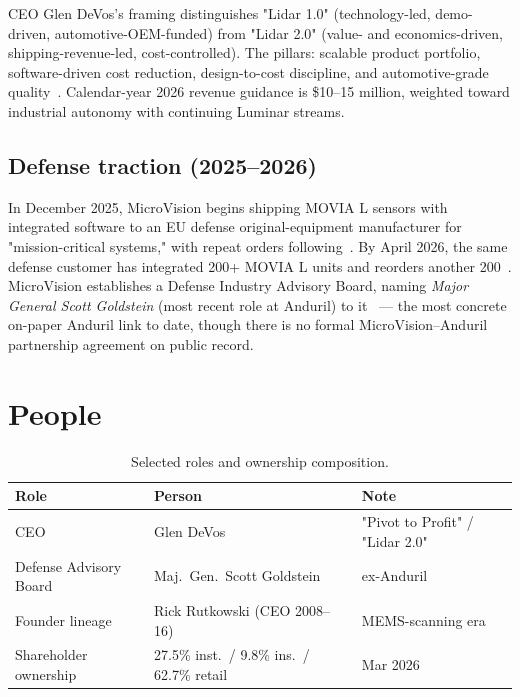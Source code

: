 \documentclass[10pt,letterpaper,twocolumn]{article}
\begin{document}
CEO Glen DeVos's framing distinguishes "Lidar 1.0" (technology-led, demo-driven, automotive-OEM-funded) from "Lidar 2.0" (value- and economics-driven, shipping-revenue-led, cost-controlled). The pillars: scalable product portfolio, software-driven cost reduction, design-to-cost discipline, and automotive-grade quality~\citep{mvis2026lidar20,seekingalpha2026guidance}. Calendar-year 2026 revenue guidance is \$10--15 million, weighted toward industrial autonomy with continuing Luminar streams.

\subsection{Defense traction (2025--2026)}

In December 2025, MicroVision begins shipping MOVIA L sensors with integrated software to an EU defense original-equipment manufacturer for "mission-critical systems," with repeat orders following~\citep{mvis2025defense}. By April 2026, the same defense customer has integrated 200+ MOVIA L units and reorders another 200~\citep{mvis2026defense}. MicroVision establishes a Defense Industry Advisory Board, naming \emph{Major General Scott Goldstein} (most recent role at Anduril) to it~\citep{mvis2026goldstein} --- the most concrete on-paper Anduril link to date, though there is no formal MicroVision--Anduril partnership agreement on public record.

\section{People}

\begin{table}[h]
\footnotesize
\centering
\setlength{\tabcolsep}{3pt}
\begin{tabularx}{\columnwidth}{lXX}
\toprule
\textbf{Role} & \textbf{Person} & \textbf{Note} \\
\midrule
CEO & Glen DeVos & "Pivot to Profit" / "Lidar 2.0" \\
Defense Advisory Board & Maj.\ Gen.\ Scott Goldstein & ex-Anduril \\
Founder lineage & Rick Rutkowski (CEO 2008--16) & MEMS-scanning era \\
Shareholder ownership & 27.5\% inst.\ / 9.8\% ins.\ / 62.7\% retail & Mar 2026 \\
\bottomrule
\end{tabularx}
\caption{Selected roles and ownership composition.}
\label{tab:people}
\end{table}
\end{document}
